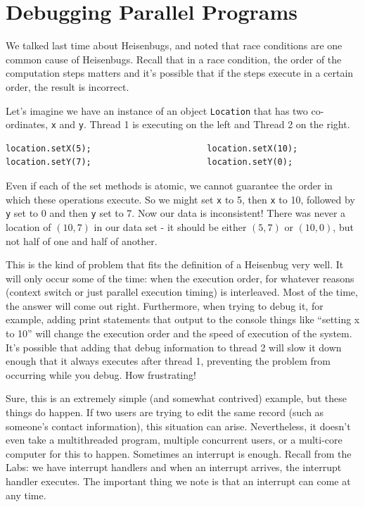 




\section*{Debugging Parallel Programs}

We talked last time about Heisenbugs, and noted that race conditions are one common cause of Heisenbugs. Recall that in a race condition, the order of the computation steps matters and it's possible that if the steps execute in a certain order, the result is incorrect.

Let's imagine we have an instance of an object \texttt{Location} that has two co-ordinates, \texttt{x} and \texttt{y}. Thread 1 is executing on the left and Thread 2 on the right.

\begin{verbatim}
location.setX(5);                       location.setX(10);
location.setY(7);                       location.setY(0);
\end{verbatim}

Even if each of the set methods is atomic, we cannot guarantee the order in which these operations execute. So we might set \texttt{x} to 5, then \texttt{x} to 10, followed by \texttt{y} set to 0 and then \texttt{y} set to 7. Now our data is inconsistent! There was never a location of $(10, 7)$ in our data set - it should be either $(5, 7)$ or $(10, 0)$, but not half of one and half of another.

This is the kind of problem that fits the definition of a Heisenbug very well. It will only occur some of the time: when the execution order, for whatever reasons (context switch or just parallel execution timing) is interleaved. Most of the time, the answer will come out right. Furthermore, when trying to debug it, for example, adding print statements that output to the console things like ``setting x to 10'' will change the execution order and the speed of execution of the system. It's possible that adding that debug information to thread 2 will slow it down enough that it always executes after thread 1, preventing the problem from occurring while you debug. How frustrating!

Sure, this is an extremely simple (and somewhat contrived) example, but these things do happen. If two users are trying to edit the same record (such as someone's contact information), this situation can arise. Nevertheless, it doesn't even take a multithreaded program, multiple concurrent users, or a multi-core computer for this to happen. Sometimes an interrupt is enough. Recall from the Labs: we have interrupt handlers and when an interrupt arrives, the interrupt handler executes. The important thing we note is that an interrupt can come at any time.

